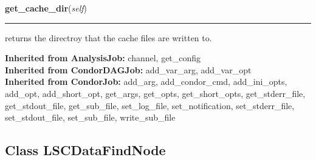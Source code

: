     \label{stochastic:LSCDataFindJob:get_cache_dir}
    \vspace{0.5ex}

    \begin{boxedminipage}{\textwidth}

    \raggedright \textbf{get\_cache\_dir}(\textit{self})

    \vspace{-1.5ex}

    \rule{\textwidth}{0.5\fboxrule}
    returns the directroy that the cache files are written to.

    \vspace{1ex}

    \end{boxedminipage}

  \textbf{Inherited from AnalysisJob:}
    channel,
    get\_config
    \\
  \textbf{Inherited from CondorDAGJob:}
    add\_var\_arg,
    add\_var\_opt
    \\
  \textbf{Inherited from CondorJob:}
    add\_arg,
    add\_condor\_cmd,
    add\_ini\_opts,
    add\_opt,
    add\_short\_opt,
    get\_args,
    get\_opts,
    get\_short\_opts,
    get\_stderr\_file,
    get\_stdout\_file,
    get\_sub\_file,
    set\_log\_file,
    set\_notification,
    set\_stderr\_file,
    set\_stdout\_file,
    set\_sub\_file,
    write\_sub\_file


\subsection{Class LSCDataFindNode}

